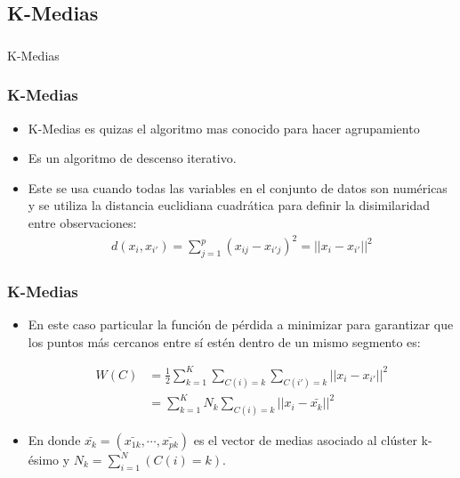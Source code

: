 \documentclass[
  shownotes,
  xcolor={svgnames},
  hyperref={colorlinks,citecolor=DarkBlue,linkcolor=DarkRed,urlcolor=DarkBlue}
  , aspectratio=169]{beamer}
\begin{document}
\subsection{K-Medias}
\begin{frame}[fragile]
\frametitle{}


\centering
{\huge \textcolor{andesred}{K-Medias}}



\end{frame}
\begin{frame}
\frametitle{K-Medias}


\begin{itemize}
  \item K-Medias es quizas el algoritmo mas conocido para hacer agrupamiento
\medskip
\item Es un algoritmo de descenso iterativo. 
\medskip
\item Este se usa cuando todas las variables en el conjunto de datos son numéricas y se utiliza la distancia euclidiana cuadrática para definir la disimilaridad entre observaciones:
\medskip
\begin{align}
d(x_i, x_{i'})=\sum_{j=1}^p(x_{ij}-x_{i'j})^2=||x_i-x_{i'}||^2 
\end{align}
\end{itemize}



\end{frame}
\begin{frame}
\frametitle{K-Medias}


\begin{itemize}

\item En este caso particular la función de pérdida a minimizar para garantizar que los puntos más cercanos entre sí estén dentro de un mismo segmento
es:

\begin{align}
W(C) &= \frac{1}{2}\sum_{k=1}^K\sum_{C(i)=k}\sum_{C(i')=k}||x_i-x_{i'}||^2 \\
     &= \sum_{k=1}^K N_k\sum_{C(i)=k}||x_i-\bar{x_{k}}||^2 
\end{align}



\item En donde \(\bar{x_{k}}=(\bar{x_{1k}}, \cdots, \bar{x_{pk}})\) es el vector de
medias asociado al clúster k-ésimo y \(N_k=\sum_{i=1}^N(C(i)=k)\). 


\end{itemize}



\end{frame}
\end{document}
